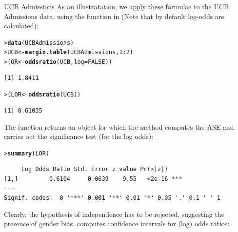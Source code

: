 \documentclass[10pt,krantz2]{krantz}\usepackage[]{graphicx}\usepackage[]{color}
\makeatletter
\newcommand{\hlnum}[1]{\textcolor[rgb]{0.686,0.059,0.569}{#1}}%
\newcommand{\hlopt}[1]{\textcolor[rgb]{0,0,0}{#1}}%
\newcommand{\hlstd}[1]{\textcolor[rgb]{0.345,0.345,0.345}{#1}}%
\newcommand{\hlkwb}[1]{\textcolor[rgb]{0.69,0.353,0.396}{#1}}%
\newcommand{\hlkwc}[1]{\textcolor[rgb]{0.333,0.667,0.333}{#1}}%
\newcommand{\hlkwd}[1]{\textcolor[rgb]{0.737,0.353,0.396}{\textbf{#1}}}%
\newenvironment{kframe}{%
 \def\at@end@of@kframe{}%
 \ifinner\ifhmode%
  \def\at@end@of@kframe{\end{minipage}}%
  \begin{minipage}{\columnwidth}%
 \fi\fi%
 \def\FrameCommand##1{\hskip\@totalleftmargin \hskip-\fboxsep
 \colorbox{shadecolor}{##1}\hskip-\fboxsep
     \hskip-\linewidth \hskip-\@totalleftmargin \hskip\columnwidth}%
 \MakeFramed {\advance\hsize-\width
   \@totalleftmargin\z@ \linewidth\hsize
   \@setminipage}}%
 {\par\unskip\endMakeFramed%
 \at@end@of@kframe}
\newenvironment{knitrout}{}{} %
\renewenvironment{knitrout}{\small\renewcommand{\baselinestretch}{.85}}{} %
\makeatother
\begin{document}
\begin{Example}[ucbadmissions]{UCB Admissions}
As an illustratation, we apply these formulae to the UCB Admissions
data, using the  function in  (Note that by
default log-odds are calculated): 
\begin{knitrout}
\color{fgcolor}\begin{kframe}
\begin{alltt}
\hlstd{> }\hlkwd{data}\hlstd{(UCBAdmissions)}
\hlstd{> }\hlstd{UCB} \hlkwb{<-} \hlkwd{margin.table}\hlstd{(UCBAdmissions,} \hlnum{1}\hlopt{:}\hlnum{2}\hlstd{)}
\hlstd{> }\hlstd{(OR} \hlkwb{<-} \hlkwd{oddsratio}\hlstd{(UCB,} \hlkwc{log} \hlstd{=} \hlnum{FALSE}\hlstd{))}
\end{alltt}
\begin{verbatim}
[1] 1.8411
\end{verbatim}
\begin{alltt}
\hlstd{> }\hlstd{(LOR} \hlkwb{<-} \hlkwd{oddsratio}\hlstd{(UCB))}
\end{alltt}
\begin{verbatim}
[1] 0.61035
\end{verbatim}
\end{kframe}
\end{knitrout}
\noindent The function returns an object for which the 
method computes the ASE and carries out the significance test (for the
log odds):
\begin{knitrout}
\color{fgcolor}\begin{kframe}
\begin{alltt}
\hlstd{> }\hlkwd{summary}\hlstd{(LOR)}
\end{alltt}
\begin{verbatim}
     Log Odds Ratio Std. Error z value Pr(>|z|)    
[1,]         0.6104     0.0639    9.55   <2e-16 ***
---
Signif. codes:  0 '***' 0.001 '**' 0.01 '*' 0.05 '.' 0.1 ' ' 1
\end{verbatim}
\end{kframe}
\end{knitrout}
\noindent Clearly, the hypothesis of independence has to be rejected,
suggesting the presence of gender bias.
 computes confidence intervals for (log) odds ratios:
\begin{knitrout}
\color{fgcolor}\begin{kframe}
\begin{alltt}

\end{alltt}
\end{kframe}
\end{knitrout}
\end{Example}
\end{document}
